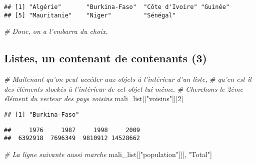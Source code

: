 \documentclass[]{book}
\newenvironment{Shaded}{\begin{snugshade}}{\end{snugshade}}
\newcommand{\DecValTok}[1]{\textcolor[rgb]{0.00,0.00,0.81}{#1}}
\newcommand{\StringTok}[1]{\textcolor[rgb]{0.31,0.60,0.02}{#1}}
\newcommand{\CommentTok}[1]{\textcolor[rgb]{0.56,0.35,0.01}{\textit{#1}}}
\newcommand{\NormalTok}[1]{#1}
\begin{document}
\begin{verbatim}
## [1] "Algérie"       "Burkina-Faso"  "Côte d'Ivoire" "Guinée"       
## [5] "Mauritanie"    "Niger"         "Sénégal"
\end{verbatim}

\begin{Shaded}
\begin{Highlighting}[]
\CommentTok{# Donc, on a l'embarra du choix.}
\end{Highlighting}
\end{Shaded}

\normalsize

\subsection{Listes, un contenant de contenants
(3)}\label{listes-un-contenant-de-contenants-3}

\tiny

\begin{Shaded}
\begin{Highlighting}[]
\CommentTok{# Maitenant qu'on peut accéder aux objets à l'intérieur d'un liste,}
\CommentTok{# qu'en est-il des éléments stockés à l'intérieur de cet objet lui-même.}
\CommentTok{# Cherchons le 2ème élément du vecteur des pays voisins}
\NormalTok{mali_list[[}\StringTok{"voisins"}\NormalTok{]][}\DecValTok{2}\NormalTok{]}
\end{Highlighting}
\end{Shaded}

\begin{verbatim}
## [1] "Burkina-Faso"
\end{verbatim}

\begin{Shaded}
\end{Shaded}

\begin{verbatim}
##     1976     1987     1998     2009 
##  6392918  7696349  9810912 14528662
\end{verbatim}

\begin{Shaded}
\begin{Highlighting}[]
\CommentTok{# La ligne suivante aussi marche}
\NormalTok{mali_list[[}\StringTok{"population"}\NormalTok{]][, }\StringTok{"Total"}\NormalTok{]}
\end{Highlighting}
\end{Shaded}
\end{document}
